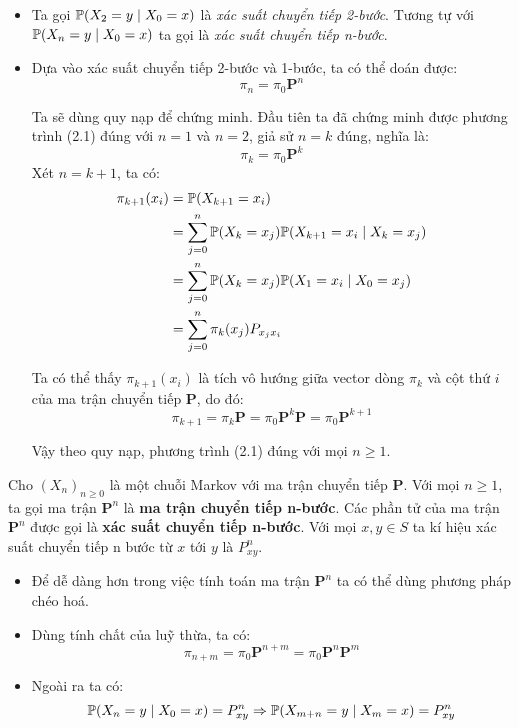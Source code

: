\begin{itemize}
    \item Ta gọi $\P(X_2 = y \mid X_0 = x)$ là \textit{xác suất chuyển tiếp 2-bước}. Tương tự với $\P(X_n = y \mid X_0 = x)$ ta gọi là \textit{xác suất chuyển tiếp n-bước}.

    \item Dựa vào xác suất chuyển tiếp 2-bước và 1-bước, ta có thể doán được:
    \begin{equation}
    \pi_n = \pi_0 \mathbf{P}^{n}
    \end{equation}
    
    \begin{proofvn} Ta sẽ dùng quy nạp để chứng minh. Đầu tiên ta đã chứng minh được phương trình (2.1) đúng với $n = 1$ và $n = 2$, giả sử $n = k$ đúng, nghĩa là:
    $$
    \pi_k = \pi_0 \mathbf{P}^k
    $$
    \noindent Xét $n = k+1$, ta có:
    $$ 
    \begin{aligned}
    \pi_{k+1}(x_i) &= \P(X_{k+1} = x_i) \\
    &= \sum_{j=0}^{n} \P(X_{k} = x_j) \P(X_{k+1} = x_i \mid X_k = x_j) \\
    &= \sum_{j=0}^{n} \P(X_{k} = x_j) \P(X_1 = x_i \mid X_0 = x_j) \\
    &= \sum_{j=0}^{n} \pi_{k}(x_j) P_{x_jx_i} \\
    \end{aligned}
    $$

    \noindent Ta có thể thấy $\pi_{k+1}(x_i)$ là tích vô hướng giữa vector dòng $\pi_k$ và cột thứ $i$ của ma trận chuyển tiếp $\mathbf{P}$, do đó:
    $$
    \pi_{k+1} = \pi_k \mathbf{P} = \pi_0 \mathbf{P}^{k} \mathbf{P} = \pi_0 \mathbf{P}^{k+1}
    $$

    \noindent Vậy theo quy nạp, phương trình (2.1) đúng với mọi $n \geq 1$.
    \end{proofvn}
\end{itemize}

\begin{defivn}
    Cho $(X_n)_{n \geq 0}$ là một chuỗi Markov với ma trận chuyển tiếp $\mathbf{P}$. Với mọi $n \geq 1$, ta gọi ma trận $\mathbf{P}^n$ là \textbf{ma trận chuyển tiếp n-bước}. Các phần tử của ma trận $\mathbf{P}^n$ được gọi là \textbf{xác suất chuyển tiếp n-bước}. Với mọi $x, y \in S$  ta kí hiệu xác suất chuyển tiếp n bước từ $x$ tới $y$ là $P^n_{xy}$.
\end{defivn}

\begin{itemize}
    \item Để dễ dàng hơn trong việc tính toán ma trận $\mathbf{P}^n$ ta có thể dùng phương pháp chéo hoá.
    \item Dùng tính chất của luỹ thừa, ta có:
    $$
    \pi_{n + m} = \pi_0 \mathbf{P}^{n + m} = \pi_0 \mathbf{P}^n \mathbf{P}^m
    $$

    \item Ngoài ra ta có:
    $$
    \P(X_n = y \mid X_0 = x) = P^n_{xy} \implies \P(X_{m + n} = y \mid X_{m} = x) = P^n_{xy}
    $$
\end{itemize}

